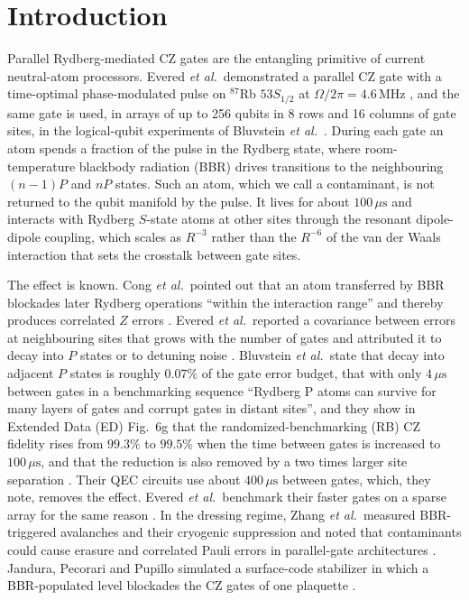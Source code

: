 \documentclass[aps,pra,twocolumn,superscriptaddress,longbibliography,floatfix]{revtex4-2}
\newcommand{\us}{\,\mu\mathrm{s}}
\newcommand{\MHz}{\,\mathrm{MHz}}
\begin{document}
\maketitle

\section{Introduction}
\label{sec:intro}

Parallel Rydberg-mediated CZ gates are the entangling primitive of current neutral-atom processors. Evered \textit{et al.}\ demonstrated a parallel CZ gate with a time-optimal phase-modulated pulse on $^{87}$Rb $53S_{1/2}$ at $\Omega/2\pi=4.6\MHz$ \cite{Evered2023}, and the same gate is used, in arrays of up to 256 qubits in 8 rows and 16 columns of gate sites, in the logical-qubit experiments of Bluvstein \textit{et al.}\ \cite{Bluvstein2026}. During each gate an atom spends a fraction of the pulse in the Rydberg state, where room-temperature blackbody radiation (BBR) drives transitions to the neighbouring $(n-1)P$ and $nP$ states. Such an atom, which we call a contaminant, is not returned to the qubit manifold by the pulse. It lives for about $100\us$ and interacts with Rydberg $S$-state atoms at other sites through the resonant dipole-dipole coupling, which scales as $R^{-3}$ rather than the $R^{-6}$ of the van der Waals interaction that sets the crosstalk between gate sites.

The effect is known. Cong \textit{et al.}\ pointed out that an atom transferred by BBR blockades later Rydberg operations ``within the interaction range'' and thereby produces correlated $Z$ errors \cite{Cong2022}. Evered \textit{et al.}\ reported a covariance between errors at neighbouring sites that grows with the number of gates and attributed it to decay into $P$ states or to detuning noise \cite{Evered2023}. Bluvstein \textit{et al.}\ state that decay into adjacent $P$ states is roughly $0.07\%$ of the gate error budget, that with only $4\us$ between gates in a benchmarking sequence ``Rydberg P atoms can survive for many layers of gates and corrupt gates in distant sites'', and they show in Extended Data (ED) Fig.~6g that the randomized-benchmarking (RB) CZ fidelity rises from $99.3\%$ to $99.5\%$ when the time between gates is increased to $100\us$, and that the reduction is also removed by a two times larger site separation \cite{Bluvstein2026}. Their QEC circuits use about $400\us$ between gates, which, they note, removes the effect. Evered \textit{et al.}\ benchmark their faster gates on a sparse array for the same reason \cite{Evered2026}. In the dressing regime, Zhang \textit{et al.}\ measured BBR-triggered avalanches and their cryogenic suppression and noted that contaminants could cause erasure and correlated Pauli errors in parallel-gate architectures \cite{Zhang2026}. Jandura, Pecorari and Pupillo simulated a surface-code stabilizer in which a BBR-populated level blockades the CZ gates of one plaquette \cite{Jandura2024}.
\end{document}
